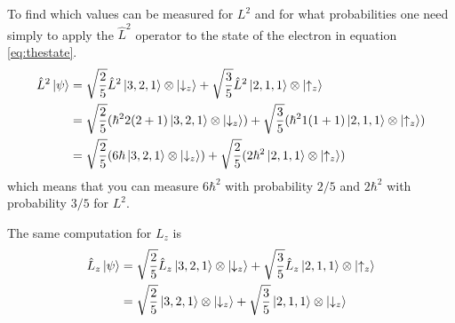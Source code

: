 \documentclass[]{article}
\begin{document}
To find which values can be measured for $L^2$ and for what probabilities one need simply to apply the $\hat{L}^2$ operator to the state of the electron in equation \ref{eq:thestate}.
\begin{align*}
\hat{L}^2\ket{\psi}
&=\sqrt{\frac{2}{5}}\hat{L}^2\ket{3,2,1}\otimes\ket{\downarrow_z}
+ \sqrt{\frac{3}{5}}\hat{L}^2\ket{2,1,1}\otimes\ket{\uparrow_z} \\
&=\sqrt{\frac{2}{5}}(\hbar^22(2+1)\ket{3,2,1}\otimes\ket{\downarrow_z})
+ \sqrt{\frac{3}{5}}(\hbar^21(1+1)\ket{2,1,1}\otimes\ket{\uparrow_z}) \\
&=\sqrt{\frac{2}{5}}(6\hbar\ket{3,2,1}\otimes\ket{\downarrow_z})
+ \sqrt{\frac{2}{5}}(2\hbar^2\ket{2,1,1}\otimes\ket{\uparrow_z})
\end{align*}
which means that you can measure $6\hbar^2$ with probability $2/5$ and $2\hbar^2$ with probability $3/5$ for $L^2$. 

The same computation for $L_z$ is
\begin{align*}
\hat{L}_z\ket{\psi}
&=\sqrt{\frac{2}{5}}\hat{L}_z\ket{3,2,1}\otimes\ket{\downarrow_z}
+ \sqrt{\frac{3}{5}}\hat{L}_z\ket{2,1,1}\otimes\ket{\uparrow_z} \\
&=\sqrt{\frac{2}{5}}\ket{3,2,1}\otimes\ket{\downarrow_z}
+ \sqrt{\frac{3}{5}}\ket{2,1,1}\otimes\ket{\downarrow_z}
\end{align*}
\end{document}
